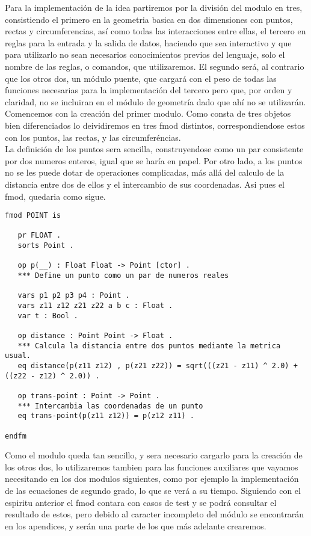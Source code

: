 Para la implementaci\'on de la idea partiremos por la división del modulo en tres, consistiendo el primero en la geometria basica en dos dimensiones con puntos, rectas y circumferencias, as\'i como todas las interacciones entre ellas, el tercero en reglas para la entrada y la salida de datos, haciendo que sea interactivo y que para utilizarlo no sean necesarios conocimientos previos del lenguaje, solo el nombre de las reglas, o comandos, que utilizaremos. El segundo ser\'a, al contrario que los otros dos, un m\'odulo puente, que cargar\'a con el peso de todas las funciones necesarias para la implementaci\'on del tercero pero que, por orden y claridad, no se incluiran en el m\'odulo de geometr\'ia dado que ah\'i no se utilizar\'an. \\

Comencemos con la creaci\'on del primer modulo.  Como consta de tres objetos bien diferenciados lo deividiremos en tres fmod distintos, correspondiendose estos con los puntos, las rectas, y las circumfer\'encias. \\

La definici\'on de los puntos sera sencilla, construyendose como un par consistente por dos numeros enteros, igual que se har\'ia en papel. Por otro lado, a los puntos no se les puede dotar de operaciones complicadas, m\'as all\'a del calculo de la distancia entre dos de ellos y el intercambio de sus coordenadas. Asi pues el fmod, quedaria como sigue.

\begin{verbatim}
fmod POINT is

   pr FLOAT .
   sorts Point .

   op p(__) : Float Float -> Point [ctor] .
   *** Define un punto como un par de numeros reales

   vars p1 p2 p3 p4 : Point .
   vars z11 z12 z21 z22 a b c : Float .
   var t : Bool .

   op distance : Point Point -> Float .
   *** Calcula la distancia entre dos puntos mediante la metrica usual.
   eq distance(p(z11 z12) , p(z21 z22)) = sqrt(((z21 - z11) ^ 2.0) + ((z22 - z12) ^ 2.0)) .

   op trans-point : Point -> Point .
   *** Intercambia las coordenadas de un punto
   eq trans-point(p(z11 z12)) = p(z12 z11) .

endfm
\end{verbatim}

Como el modulo queda tan sencillo, y sera necesario cargarlo para la creación de los otros dos, lo utilizaremos tambien para las funciones auxiliares que vayamos necesitando en los dos modulos siguientes, como por ejemplo la implementaci\'on de las ecuaciones de segundo grado, lo que se ver\'a a su tiempo. Siguiendo con el espiritu anterior el fmod contara con casos de test y se podr\'a consultar el resultado de estos, pero debido al caracter incompleto del m\'odulo se encontrar\'an en los apendices, y ser\'an una parte de los que m\'as adelante crearemos. \\

